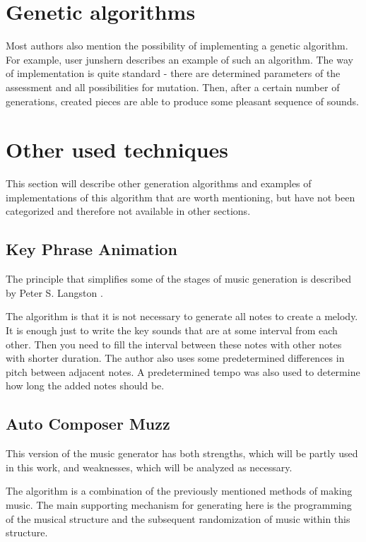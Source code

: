 \documentclass[thesis=B,english]{FITthesis}[2019/12/23]
\begin{document}
\section{Genetic algorithms}

Most authors also mention the possibility of implementing a genetic algorithm. For example, user junshern \cite{junshern_github} describes an example of such an algorithm. The way of implementation is quite standard - there are determined parameters of the assessment and all possibilities for mutation. Then, after a certain number of generations, created pieces are able to produce some pleasant sequence of sounds.

\section{Other used techniques}

This section will describe other generation algorithms and examples of implementations of this algorithm that are worth mentioning, but have not been categorized and therefore not available in other sections.

\subsection{Key Phrase Animation}

The principle that simplifies some of the stages of music generation is described by Peter S. Langston \cite{langston}.

The algorithm is that it is not necessary to generate all notes to create a melody. It is enough just to write the key sounds that are at some interval from each other. Then you need to fill the interval between these notes with other notes with shorter duration. The author also uses some predetermined differences in pitch between adjacent notes. A predetermined tempo was also used to determine how long the added notes should be.

\subsection{Auto Composer Muzz}

This version of the music generator has both strengths, which will be partly used in this work, and weaknesses, which will be analyzed as necessary. 

The algorithm is a combination of the previously mentioned methods of making music. The main supporting mechanism for generating here is the programming of the musical structure and the subsequent randomization of music within this structure.
\end{document}
